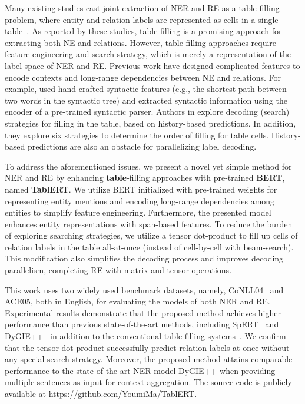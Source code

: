 \documentclass[11pt,a4paper]{article}
\begin{document}
Many existing studies cast joint extraction of NER and RE as a table-filling problem, where entity and relation labels are represented as cells in a single table~\cite{miwa-sasaki-2014-modeling,gupta-etal-2016-table,zhang-etal-2017-end}. As reported by these studies, table-filling is a promising approach for extracting both NE and relations. However, table-filling approaches require feature engineering and search strategy, which is merely a representation of the label space of NER and RE.
Previous work have designed complicated features to encode contexts and long-range dependencies between NE and relations. For example, \citet{miwa-sasaki-2014-modeling} used hand-crafted syntactic features (e.g., the shortest path between two words in the syntactic tree) and \citet{zhang-etal-2017-end} extracted syntactic information using the encoder of a pre-trained syntactic parser.
Authors in \citet{miwa-sasaki-2014-modeling} explore decoding (search) strategies for filling in the table, based on history-based predictions. In addition, they explore six strategies to determine the order of filling for table cells.
History-based predictions are also an obstacle for parallelizing label decoding.

To address the aforementioned issues, we present a novel yet simple method for NER and RE by enhancing \textbf{table}-filling approaches with pre-trained \textbf{BERT}, named \textbf{TablERT}. We utilize BERT initialized with pre-trained weights for representing entity mentions and encoding long-range dependencies among entities to simplify feature engineering. Furthermore, the presented model enhances entity representations with span-based features. To reduce the burden of exploring searching strategies, we utilize a tensor dot-product to fill up cells of relation labels in the table all-at-once (instead of cell-by-cell with beam-search). This modification also simplifies the decoding process and improves decoding parallelism, completing RE with matrix and tensor operations.

This work uses two widely used benchmark datasets, namely, CoNLL04~\cite{roth-yih-2004-linear} and ACE05, both in English, for evaluating the models of both NER and RE. Experimental results demonstrate that the proposed method achieves higher performance than previous state-of-the-art methods, including SpERT~\cite{spert} and DyGIE++~\cite{Wadden2019EntityRA} in addition to the conventional table-filling systems~\cite{miwa-sasaki-2014-modeling,zhang-etal-2017-end}.
We confirm that the tensor dot-product successfully predict relation labels at once without any special search strategy.
Moreover, the proposed method attains comparable performance to the state-of-the-art NER model DyGIE++ when providing multiple sentences as input for context aggregation. The source code is publicly available at \url{https://github.com/YoumiMa/TablERT}.
\end{document}

